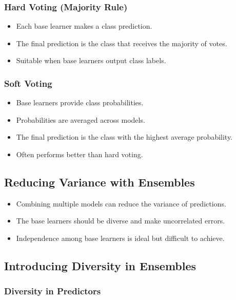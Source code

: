 \documentclass{article}
\begin{document}
\subsubsection{Hard Voting (Majority Rule)}

\begin{itemize}
    \item Each base learner makes a class prediction.
    \item The final prediction is the class that receives the majority of votes.
    \item Suitable when base learners output class labels.
\end{itemize}

\subsubsection{Soft Voting}

\begin{itemize}
    \item Base learners provide class probabilities.
    \item Probabilities are averaged across models.
    \item The final prediction is the class with the highest average probability.
    \item Often performs better than hard voting.
\end{itemize}

\subsection{Reducing Variance with Ensembles}

\begin{itemize}
    \item Combining multiple models can reduce the variance of predictions.
    \item The base learners should be diverse and make uncorrelated errors.
    \item Independence among base learners is ideal but difficult to achieve.
\end{itemize}

\subsection{Introducing Diversity in Ensembles}

\subsubsection{Diversity in Predictors}
\end{document}
